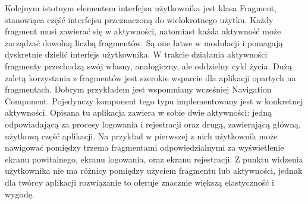     Kolejnym istotnym elementem interfejsu użytkownika jest klasa Fragment, stanowiąca część interfejsu przeznaczoną do wielokrotnego użytku. Każdy fragment musi zawierać się w aktywności, natomiast każda aktywność 
    może zarządzać dowolną liczbą fragmentów. Są one łatwe w modulacji i pomagają dyskretnie dzielić interfejs użytkownika. W trakcie działania aktywności fragmenty przechodzą swój własny, analogiczny, 
    ale oddzielny cykl życia. Dużą zaletą korzystania z fragmentów jest szerokie wsparcie dla aplikacji opartych na fragmentach. Dobrym przykładem jest wspomniany wcześniej Navigation 
    Component. Pojedynczy komponent tego typu implementowany jest w konkretnej aktywności. Opisana tu aplikacja zawiera w sobie dwie aktywności: jedną odpowiadającą za procesy logowania i rejestracji oraz drugą, 
    zawierającą główną, użytkową część aplikacji. Na przykład w pierwszej z nich użytkownik może nawigować pomiędzy trzema fragmentami odpowiedzialnymi za wyświetlenie ekranu powitalnego, ekranu logowania,
    oraz ekranu rejestracji. Z punktu widzenia użytkownika nie ma różnicy pomiędzy użyciem fragmentu lub aktywności, jednak dla twórcy aplikacji rozwiązanie to oferuje znacznie większą elastyczność i wygodę.

